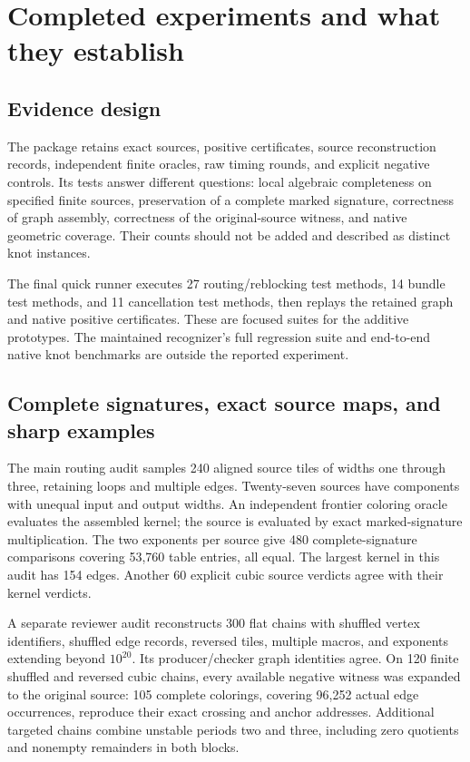 \section{Completed experiments and what they establish}
\label{sec:evidence}

\subsection{Evidence design}

The package retains exact sources, positive certificates, source reconstruction
records, independent finite oracles, raw timing rounds, and explicit negative
controls. Its tests answer different questions: local algebraic completeness
on specified finite sources, preservation of a complete marked signature,
correctness of graph assembly, correctness of the original-source witness,
and native geometric coverage. Their counts should not be added and described
as distinct knot instances.

The final quick runner executes 27 routing/reblocking test methods, 14 bundle
test methods, and 11 cancellation test methods, then replays the retained
graph and native positive certificates. These are focused suites for the
additive prototypes. The maintained recognizer's full regression suite and
end-to-end native knot benchmarks are outside the reported experiment.





\subsection{Complete signatures, exact source maps, and sharp examples}

The main routing audit samples 240 aligned source tiles of widths one through
three, retaining loops and multiple edges. Twenty-seven sources have
components with unequal input and output widths. An independent frontier
coloring oracle evaluates the assembled kernel; the source is evaluated by
exact marked-signature multiplication. The two exponents per source give 480
complete-signature comparisons covering 53,760 table entries, all equal.
The largest kernel in this audit has 154 edges. Another 60 explicit cubic
source verdicts agree with their kernel verdicts.

A separate reviewer audit reconstructs 300 flat chains with shuffled vertex
identifiers, shuffled edge records, reversed tiles, multiple macros, and
exponents extending beyond $10^{20}$. Its producer/checker graph identities
agree. On 120 finite shuffled and reversed cubic chains, every available
negative witness was expanded to the original source: 105 complete colorings,
covering 96,252 actual edge occurrences, reproduce their exact crossing and
anchor addresses. Additional targeted chains combine unstable periods two
and three, including zero quotients and nonempty remainders in both blocks.

